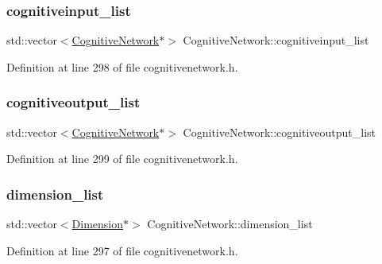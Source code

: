 \subsubsection{\texorpdfstring{cognitiveinput\+\_\+list}{cognitiveinput\_list}}
{\footnotesize\ttfamily std\+::vector$<$\mbox{\hyperlink{class_cognitive_network}{Cognitive\+Network}}$\ast$$>$ Cognitive\+Network\+::cognitiveinput\+\_\+list\hspace{0.3cm}{\ttfamily [protected]}}



Definition at line 298 of file cognitivenetwork.\+h.

\mbox{\label{class_cognitive_network_a7a57ad82736c0d8b03e7607b5c603b00}} 
\subsubsection{\texorpdfstring{cognitiveoutput\+\_\+list}{cognitiveoutput\_list}}
{\footnotesize\ttfamily std\+::vector$<$\mbox{\hyperlink{class_cognitive_network}{Cognitive\+Network}}$\ast$$>$ Cognitive\+Network\+::cognitiveoutput\+\_\+list\hspace{0.3cm}{\ttfamily [protected]}}



Definition at line 299 of file cognitivenetwork.\+h.

\mbox{\label{class_cognitive_network_a79f0541fde6dd50f8e87f3f46d849b95}} 
\subsubsection{\texorpdfstring{dimension\+\_\+list}{dimension\_list}}
{\footnotesize\ttfamily std\+::vector$<$\mbox{\hyperlink{class_dimension}{Dimension}}$\ast$$>$ Cognitive\+Network\+::dimension\+\_\+list\hspace{0.3cm}{\ttfamily [protected]}}



Definition at line 297 of file cognitivenetwork.\+h.

